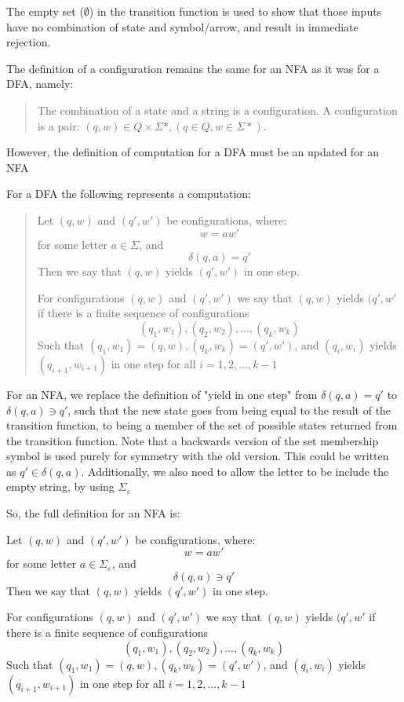 \documentclass[11pt]{article}
\begin{document}
The empty set ($\emptyset$) in the transition function is used to show that
those inputs have no combination of state and symbol/arrow, and result in
immediate rejection.

The definition of a configuration remains the same for an NFA as it was for a
DFA, namely:
\begin{quote}
The combination of a state and a string is a configuration.
A configuration is a pair: $(q, w) \in Q \times \Sigma\ast, (q \in Q, w \in
	\Sigma\ast)$.
\end{quote}

However, the definition of computation for a DFA must be an updated for an NFA

For a DFA the following represents a computation:
\begin{quote}
Let $(q, w)$ and $(q', w')$ be configurations, where:
$$w = aw'$$
for some letter $a \in \Sigma$, and
$$\delta(q, a) = q'$$
Then we say that $(q, w)$ yields $(q', w')$ in one step.

For configurations $(q, w)$ and $(q', w')$ we say that $(q, w)$ yields $(q', w'$
if there is a finite sequence of configurations
$$(q_1, w_1), (q_2, w_2), ..., (q_k, w_k)$$
Such that $(q_1, w_1)=(q,w), (q_k, w_k)=(q',w')$, and
$(q_i, w_i)$ yields $(q_{i+1}, w_{i+1})$ in one step for all $i=1, 2, ..., k-1$
\end{quote}

For an NFA, we replace the definition of "yield in one step" from
$\delta(q,a)=q'$ to $\delta(q,a) \ni q'$, such that the new state goes from
being equal to the result of the transition function, to being a member of the
set of possible states returned from the transition function. Note that a
backwards version of the set membership symbol is used purely for symmetry with
the old version. This could be written as $q' \in \delta(q,a)$. Additionally, we
also need to allow the letter to be include the empty string, by using
$\Sigma_\varepsilon$

So, the full definition for an NFA is:

Let $(q, w)$ and $(q', w')$ be configurations, where:
$$w = aw'$$
for some letter $a \in \Sigma_\varepsilon$, and
$$\delta(q, a) \ni q'$$
Then we say that $(q, w)$ yields $(q', w')$ in one step.

For configurations $(q, w)$ and $(q', w')$ we say that $(q, w)$ yields $(q', w'$
if there is a finite sequence of configurations
$$(q_1, w_1), (q_2, w_2), ..., (q_k, w_k)$$
Such that $(q_1, w_1)=(q,w), (q_k, w_k)=(q',w')$, and
$(q_i, w_i)$ yields $(q_{i+1}, w_{i+1})$ in one step for all $i=1, 2, ..., k-1$
\end{document}
